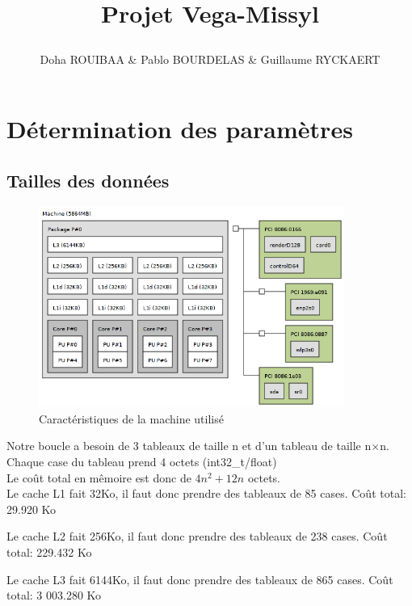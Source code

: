 \documentclass{report}
\begin{document}
\title{%
    \begin{minipage}\linewidth
        \centering
        Projet Vega-Missyl
        \vskip 3pt
        \author{ Doha ROUIBAA & Pablo BOURDELAS & Guillaume RYCKAERT }
    \end{minipage}
}
\maketitle

\section*{Détermination des paramètres}

\subsection*{Tailles des données}
    \begin{figure}[ht!]
        \centering
        \includegraphics[width=100mm]{MEDIA/Topo.png}
        \caption{Caractéristiques de la machine utilisé}
    \end{figure}


Notre boucle a besoin de 3 tableaux de taille n et d'un tableau de taille n$\times$n.\\
Chaque case du tableau prend 4 octets (int32\_t/float)\\
Le coût total en mêmoire est donc de $4n^2+12n$ octets.\\

Le cache L1 fait 32Ko, il faut donc prendre des tableaux de 85 cases. Coût total: 29.920 Ko

Le cache L2 fait 256Ko, il faut donc prendre des tableaux de 238 cases. Coût total: 229.432 Ko

Le cache L3 fait 6144Ko, il faut donc prendre des tableaux de 865 cases. Coût total: 3 003.280 Ko
\end{document}
